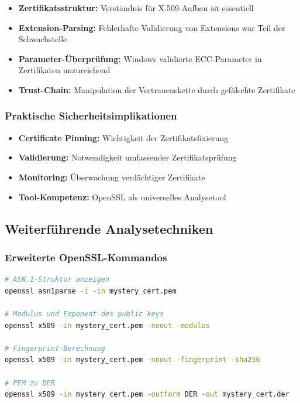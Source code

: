 \documentclass{article}
\begin{document}
\begin{itemize}
    \item \textbf{Zertifikatsstruktur:} Verständnis für X.509-Aufbau ist essentiell
    \item \textbf{Extension-Parsing:} Fehlerhafte Validierung von Extensions war Teil der Schwachstelle
    \item \textbf{Parameter-Überprüfung:} Windows validierte ECC-Parameter in Zertifikaten unzureichend
    \item \textbf{Trust-Chain:} Manipulation der Vertrauenskette durch gefälschte Zertifikate
\end{itemize}

\subsubsection{Praktische Sicherheitsimplikationen}
\begin{itemize}
    \item \textbf{Certificate Pinning:} Wichtigkeit der Zertifikatsfixierung
    \item \textbf{Validierung:} Notwendigkeit umfassender Zertifikatsprüfung
    \item \textbf{Monitoring:} Überwachung verdächtiger Zertifikate
    \item \textbf{Tool-Kompetenz:} OpenSSL als universelles Analysetool
\end{itemize}

\subsection{Weiterführende Analysetechniken}

\subsubsection{Erweiterte OpenSSL-Kommandos}
\begin{lstlisting}[language=bash,caption={Erweiterte Zertifikatsanalyse}]
# ASN.1-Struktur anzeigen
openssl asn1parse -i -in mystery_cert.pem

# Modulus und Exponent des public keys
openssl x509 -in mystery_cert.pem -noout -modulus

# Fingerprint-Berechnung
openssl x509 -in mystery_cert.pem -noout -fingerprint -sha256

# PEM zu DER
openssl x509 -in mystery_cert.pem -outform DER -out mystery_cert.der
\end{lstlisting}
\end{document}
